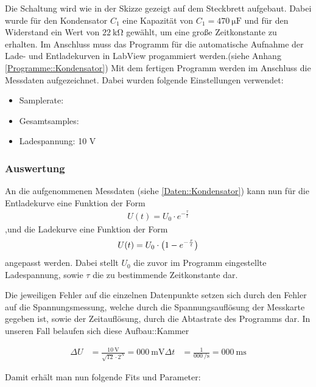 \documentclass[12pt,twoside,a4paper]{scrartcl}
\begin{document}
				Die Schaltung wird wie in der Skizze gezeigt auf dem Steckbrett aufgebaut. Dabei wurde für den Kondensator $C_1$ eine Kapazität von $C_1 = \SI{470}{\micro \farad}$ und für den Widerstand ein Wert von $\SI{22}{\kilo \ohm}$ gewählt, um eine große Zeitkonstante zu erhalten. Im Anschluss muss das Programm für die automatische Aufnahme der Lade- und Entladekurven in LabView progammiert werden.(siehe Anhang \ref{Programme::Kondensator}) Mit dem fertigen Programm werden im Anschluss die Messdaten aufgezeichnet. Dabei wurden folgende Einstellungen verwendet:

				\begin{itemize}
					\item Samplerate:
					\item Gesamtsamples:
					\item Ladespannung: 10 V
				\end{itemize}

			\subsubsection{Auswertung}

				An die aufgenommenen Messdaten (siehe \ref{Daten::Kondensator}) kann nun für die Entladekurve eine Funktion der Form
				\begin{align*}
					U(t) = U_0 \cdot e^{-\frac{\tau}{t}}
				\end{align*}
				,und die Ladekurve eine Funktion der Form
				\begin{align*}
					U(t) = U_0 \cdot \qty(1-e^{-\frac{\tau}{t}})
				\end{align*}
				angepasst werden. Dabei stellt $U_0$ die zuvor im Programm eingestellte Ladespannung, sowie $\tau$ die zu bestimmende Zeitkonstante dar.

				Die jeweiligen Fehler auf die einzelnen Datenpunkte setzen sich durch den Fehler auf die Spannungsmessung, welche durch die Spannungsauflösung der Messkarte gegeben ist, sowie der Zeitauflösung, durch die Abtastrate des Programms dar. In unseren Fall belaufen sich diese Aufbau::Kammer

				\begin{align}
					\label{Kondensator::Messfehler}
					\Delta U &= \frac{\SI{10}{\volt}}{\sqrt{12} \cdot 2^{N}} = \SI{000}{\milli \volt}
					\Delta t &= \frac{1}{\SI{000}{\per \second}} =  \SI{000}{\milli \second} %
				\end{align}

				Damit erhält man nun folgende Fits und Parameter:
\end{document}
